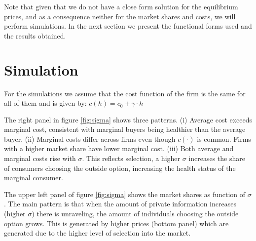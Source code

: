 \documentclass[12pt]{article}
\theoremstyle{plain}
\theoremstyle{plain}
\begin{document}
Note that given that we do not have a close form solution for the equilibrium prices, and as a consequence neither for the market shares and costs, we will perform simulations. In the next section we present the functional forms used and the results obtained. 




\section{Simulation}\label{sec:simulation}

For the simulations we assume that the cost function of the firm is the same for all of them and is given by: 
$c(h) = c_0 + \gamma \cdot h$


The right panel in figure \ref{fig:sigma}   shows three patterns. (i) Average cost exceeds marginal cost, consistent with marginal buyers being healthier than the average buyer. (ii) Marginal costs differ across firms even though  $c(\cdot)$ is common. Firms with a higher market share have lower marginal cost.  (iii) Both average and marginal costs rise with $\sigma$. This reflects selection, a higher $\sigma$ increases the share of consumers choosing the outside option, increasing the health status of the marginal consumer. 


The upper left panel of figure \ref{fig:sigma} shows the market shares as function of $\sigma$. The main pattern is that when the amount of private information increases (higher $\sigma$) there is unraveling, the amount of individuals choosing the outside option grows. This is generated by higher prices (bottom panel) which are generated due to the higher level of selection into the market. 
\end{document}
